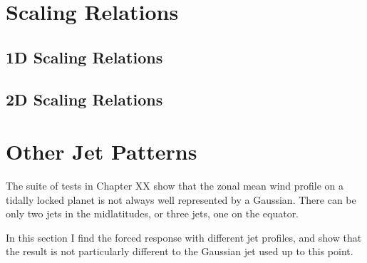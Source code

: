

\section{Scaling Relations}

\subsection{1D Scaling Relations}

\subsection{2D Scaling Relations}



\section{Other Jet Patterns}

The suite of tests in Chapter XX show that the zonal mean wind profile on a tidally locked planet is not always well represented by a Gaussian. There can be only two jets in the midlatitudes, or three jets, one on the equator.

In this section I find the forced response with different jet profiles, and show that the result is not particularly different to the Gaussian jet used up to this point.








% 
% 
